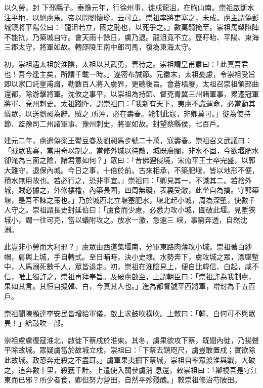\begin{pinyinscope}
 以久勞，封
 下邳縣子。泰豫元年，行徐州事，徙戍龍沮，在朐山南。崇祖啟斷水注平地，以絕虜馬。帝以問劉懷珍，云可立。崇祖率將吏塞之，未成。虜主謂偽彭城鎮將平陽公曰：「龍沮若立，國之恥也，以死爭之。」數萬騎掩至。崇祖馬槊陷陣不能抗，乃築城自守。會天雨十餘日，虜乃退。龍沮竟不立。歷盱眙、平陽、東海三郡太守，將軍如故。轉邵陵王南中郎司馬，復為東海太守。



 初，崇祖遇太祖於淮陰，太祖以其武勇，善待之。崇祖謂皇甫肅曰：「此真吾君也！吾今逢主矣，所謂千載一時。」遂密布誠節。元徽末，太祖憂慮，令崇祖受旨即以家口託皇甫肅，勒數百人將入虜界，更聽後旨。會蒼梧廢，太祖召崇祖領部曲還都，除游擊將軍。沈攸之事平，以崇祖為持節、督兗青冀三州諸軍事，累遷冠軍將軍、兗州刺史。太祖踐阼，謂崇祖曰：「我新有天下，夷虜不識運命，必當動其蟻眾，以送劉昶為辭。賊之
 所沖，必在壽春。能制此寇，非卿莫可。」徙為使持節、監豫司二州諸軍事、豫州刺史，將軍如故。封望蔡縣侯，七百戶。



 建元二年，虜遣偽梁王鬱豆眷及劉昶馬步號二十萬，寇壽春。崇祖召文武議曰：「賊眾我寡，當用奇以制之。當修外城以待敵，城既廣闊，非水不固，今欲堰肥水卻淹為三面之險，諸君意如何？」眾曰：「昔佛貍侵境，宋南平王士卒完盛，以郭大難守，退保內城。今日之事，十倍於前。古來相承，不築肥堰，皆以地形不便，積水無用故也。若必行之，恐非事宜。」崇祖曰：「卿見其一，不識其二。若捨外城，賊必據之，外修樓櫓，內築長圍，四周無礙，表裏受敵，此坐自為擒。守郭築堰，是吾不諫之策也。」乃於城西北立堰塞肥水，堰北起小城，周為深塹，使數千人守之。崇祖謂長史封延伯曰：「虜食而少慮，必悉力攻小城，圖破此堰。見塹狹城小，謂一往可克，當以蟻附攻之。放水一激，急逾三
 峽，事窮奔透，自然沈溺。



 此豈非小勞而大利邪？」虜眾由西道集堰南，分軍東路肉薄攻小城。崇祖著白紗帽，肩輿上城，手自轉式。至日晡時，決小史埭。水勢奔下，虜攻城之眾，漂墜塹中，人馬溺死數千人，眾皆退走。初，崇祖在淮陰見上，便自比韓信、白起，咸不信，唯上獨許之，崇祖再拜奉旨。及破虜啟至，上謂朝臣曰：「崇祖許為我制虜，果如其言。其恒自擬韓、白，今真其人也。」進為都督號平西將軍，增封為千五百戶。



 崇祖聞陳顯達李安民皆增給軍儀，啟上求鼓吹橫吹。上敕曰：「韓、白何可不與眾異！」給鼓吹一部。



 崇祖慮虜復寇淮北，啟徙下蔡戍於淮東。其冬，虜果欲攻下蔡，既聞內徙，乃揚聲平除故城。眾疑虜當於故城立戍，崇祖曰：「下蔡去鎮咫尺，虜豈敢置戍；實欲除此故城。政恐奔走殺之不盡耳。」虜軍果夷掘下蔡城，崇祖自率眾渡淮與戰，大破之，追奔數十里，殺獲千計。上遣使入關參虜消
 息還，敕崇祖曰：「卿視吾是守江東而已邪？所少者食，卿但努力營田，自然平殄殘醜。」敕崇祖修治芍陂田。




\end{pinyinscope}
